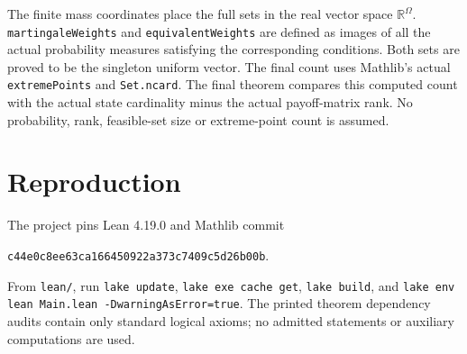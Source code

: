 \documentclass[11pt]{article}
\begin{document}
The finite mass coordinates place the full sets in the real vector space
$\mathbb R^\Omega$. \texttt{martingaleWeights} and
\texttt{equivalentWeights} are defined as images of all the actual
probability measures satisfying the corresponding conditions. Both sets
are proved to be the singleton uniform vector. The final count uses
Mathlib's actual \texttt{extremePoints} and \texttt{Set.ncard}.
The final theorem compares this computed count with the actual state
cardinality minus the actual payoff-matrix rank. No probability, rank,
feasible-set size or extreme-point count is assumed.

\section*{Reproduction}
The project pins Lean 4.19.0 and Mathlib commit
\begin{center}\small\texttt{c44e0c8ee63ca166450922a373c7409c5d26b00b}.\end{center}
From \texttt{lean/}, run \texttt{lake update}, \texttt{lake exe cache get},
\texttt{lake build}, and
\texttt{lake env lean Main.lean -DwarningAsError=true}.
The printed theorem dependency audits contain only standard logical
axioms; no admitted statements or auxiliary computations are used.
\end{document}
